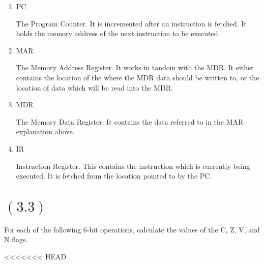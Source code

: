\documentclass[letterpaper,12pt,titlepage]{article}
\begin{document}
\renewcommand{\labelenumi}{\alph{enumi})}
\begin{enumerate}
\item PC

\begin{mdframed}[style=MyFrame]

The Program Counter. It is incremented after an instruction is fetched. It holds the memory address of the next instruction to be executed.

\end{mdframed}

\item MAR

\begin{mdframed}[style=MyFrame]

The Memory Address Register. It works in tandom with the MDR. It either contains the location of the where the MDR data should be written to, or the location of data which will be read into the MDR.

\end{mdframed}

\item MDR 

\begin{mdframed}[style=MyFrame]

The Memory Data Register. It contains the data referred to in the MAR explanation above.

\end{mdframed}

\item IR

\begin{mdframed}[style=MyFrame]

Instruction Register. This contains the instruction which is currently being executed. It is fetched from the location pointed to by the PC.

\end{mdframed}

\end{enumerate}

\section*{$(3.3)$} For each of the following 6-bit operations, calculate the values of the C, Z, V, and N flags.

<<<<<<< HEAD
\end{document}
